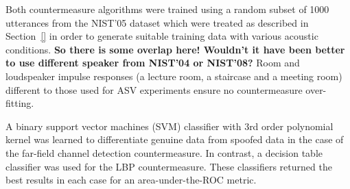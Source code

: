 Both countermeasure algorithms were trained using a random subset of 1000 utterances from the NIST'05 dataset which were treated as described in Section~\ref{} in order to generate suitable training data with various acoustic conditions.  {\bfseries So there is some overlap here!  Wouldn't it have been better to use different speaker from NIST'04 or NIST'08?} Room and loudspeaker impulse responses (a lecture room, a staircase and a meeting room) different to those used for ASV experiments ensure no countermeasure over-fitting.

A binary support vector machines (SVM) classifier with 3rd order polynomial kernel was learned to differentiate genuine data from spoofed data in the case of the far-field channel detection countermeasure.  In contrast, a decision table classifier was used for the LBP countermeasure.  These classifiers returned the best results in each case for an area-under-the-ROC metric.  %
